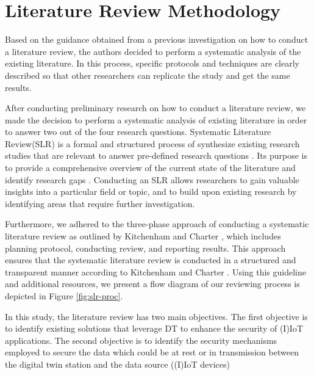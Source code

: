 \chapter{Literature Review Methodology} %

\label{Chapter2} %

Based on the guidance obtained from a previous investigation on how to conduct a literature review, the authors decided to perform a systematic analysis of the existing literature. In this process, specific protocols and techniques are clearly described so that other researchers can replicate the study and get the same results. 

After conducting preliminary research on how to conduct a literature review, we made the decision to perform a systematic analysis of existing literature in order to answer two out of the four research questions. Systematic Literature Review(SLR) is a formal and structured process of synthesize existing research studies that are relevant to answer pre-defined research questions \cite{kitchenham_guidelines_2007}. Its purpose is to provide a comprehensive overview of the current state of the literature and identify research gaps \cite{carrera-rivera_how-conduct_2022}. Conducting an SLR allows researchers to gain valuable insights into a particular field or topic, and to build upon existing research by identifying areas that require further investigation.

Furthermore, we adhered to the three-phase approach of conducting a systematic literature review as outlined by Kitchenham and Charter \cite{kitchenham_guidelines_2007}, which includes planning protocol, conducting review, and reporting results. This approach ensures that the systematic literature review is conducted in a structured and transparent manner according to Kitchenham and Charter \cite{kitchenham_guidelines_2007}. Using this guideline and additional resources, we present a flow diagram of our reviewing process is depicted in Figure \ref{fig:slr-proc}. 

In this study, the literature review has two main objectives. The first objective is to identify existing solutions that leverage DT to enhance the security of (I)IoT applications. The second objective is to identify the security mechanisms employed to secure the data which could be at rest or in transmission between the digital twin station and the data source ((I)IoT devices)



